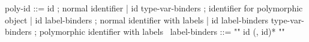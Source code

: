 \begin{syntax}
  poly-id ::= id ; normal identifier
  | id type-var-binders ; identifier for polymorphic object
  | id label-binders ; normal identifier with labels
  | id label-binders type-var-binders ; polymorphic identifier with labels
  \
  label-binders ::= "{" id (, id)* "}"
\end{syntax}